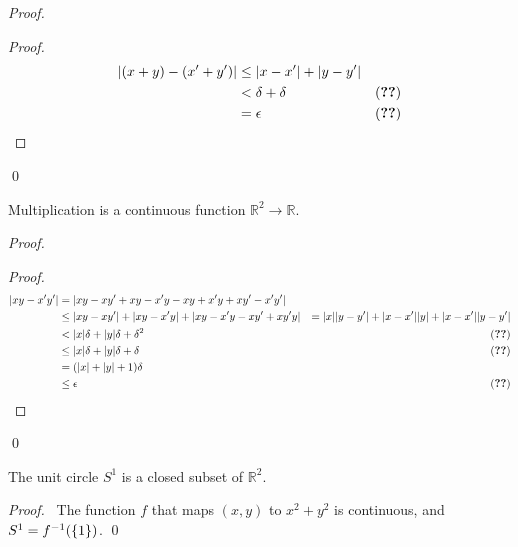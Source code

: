 \begin{proof}
\pf
{}
\begin{proof}
	\pf
	\begin{align*}
		|(x+y)-(x'+y')| & \leq |x-x'| + |y-y'| \\
		& < \delta + \delta & (\text{\stepref{4}}) \\
		& = \epsilon & (\text{\stepref{2}})
	\end{align*}
\end{proof}
\qed
\end{proof}

\begin{prop}
\label{prop:multiply_continuous}
Multiplication is a continuous function $\mathbb{R}^2 \rightarrow \mathbb{R}$.
\end{prop}

\begin{proof}
\pf
{}
\begin{proof}
	\pf
	\begin{align*}
		|xy - x'y'| & = |xy - xy' + xy - x'y - xy + x'y + xy' - x'y'| \\
		& \leq |xy-xy'| + |xy-x'y| + |xy-x'y-xy'+xy'y|
		& = |x||y-y'| + |x-x'||y| + |x-x'||y-y'| \\
		& < |x|\delta + |y|\delta + \delta^2 & (\text{\stepref{4}}) \\
		& \leq |x|\delta + |y|\delta + \delta & (\text{\stepref{2}}) \\
		& = (|x| + |y| + 1) \delta \\
		& \leq \epsilon & (\text{\stepref{2}})
	\end{align*}
\end{proof}
\qed
\end{proof}

\begin{cor}
The unit circle $S^1$ is a closed subset of $\mathbb{R}^2$.
\end{cor}

\begin{proof}
\pf\ The function $f$ that maps $(x,y)$ to $x^2 + y^2$ is continuous, and $S^1 = {f}^{-1}(\{1\})$. \qed
\end{proof}

